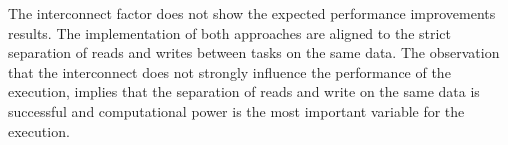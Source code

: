 The interconnect factor does not show the expected performance improvements results. The implementation of both approaches are aligned to the strict separation of reads and writes between tasks on the same data. The observation that the interconnect does not strongly influence the performance of the execution, implies that the separation of reads and write on the same data is successful and computational power is the most important variable for the execution.




